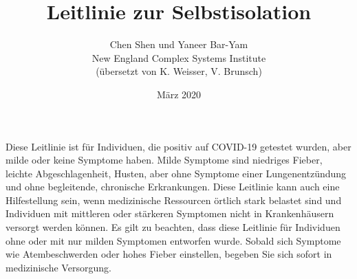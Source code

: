 \documentclass{article}
\title{Leitlinie zur Selbstisolation}
\author{Chen Shen und Yaneer Bar-Yam \\ New England Complex Systems Institute \\ (übersetzt von K. Weisser, V. Brunsch)}
\date{März 2020}
\begin{document}
\maketitle


Diese Leitlinie ist für Individuen, die positiv auf COVID-19 getestet wurden, aber milde oder keine Symptome haben. Milde Symptome sind niedriges Fieber, leichte Abgeschlagenheit, Husten, aber ohne Symptome einer Lungenentzündung und ohne begleitende, chronische Erkrankungen. Diese Leitlinie kann auch eine Hilfestellung sein, wenn medizinische Ressourcen örtlich stark belastet sind und Individuen mit mittleren oder stärkeren Symptomen nicht in Krankenhäusern versorgt werden können. Es gilt zu beachten, dass diese Leitlinie für Individuen ohne oder mit nur milden Symptomen entworfen wurde. Sobald sich Symptome wie Atembeschwerden oder hohes Fieber einstellen, begeben Sie sich sofort in medizinische Versorgung.
\end{document}
